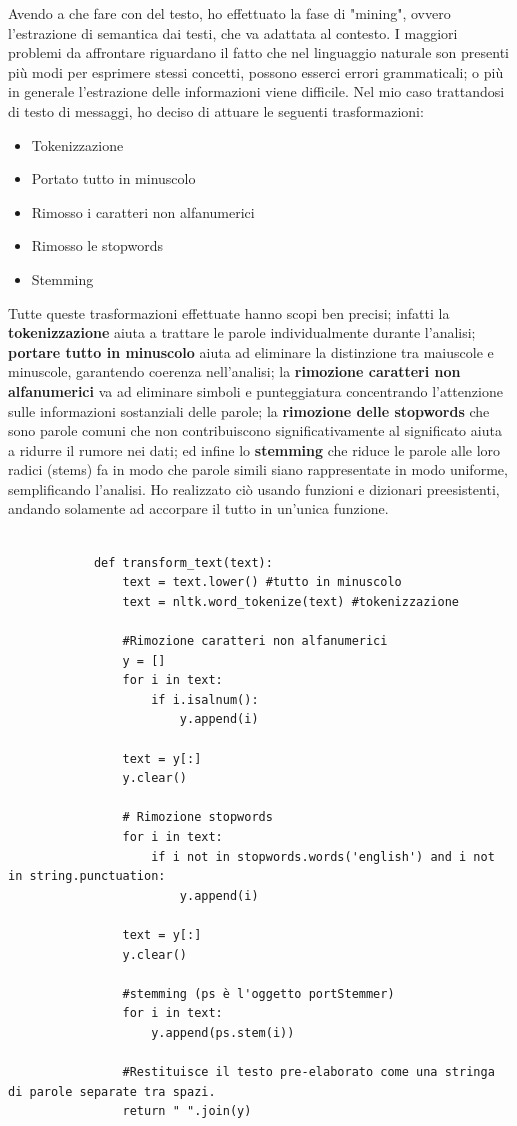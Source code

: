 \documentclass[]{article}
\begin{document}
        Avendo a che fare con del testo, ho effettuato la fase di "mining", ovvero l'estrazione di semantica dai testi, che va adattata al contesto. I maggiori problemi da affrontare riguardano il fatto che nel linguaggio naturale son presenti più modi per esprimere stessi concetti, possono esserci errori grammaticali; o più in generale l'estrazione delle informazioni viene difficile. Nel mio caso trattandosi di testo di messaggi, ho deciso di attuare le seguenti trasformazioni:
        \begin{itemize}
            \item Tokenizzazione
            \item Portato tutto in minuscolo
            \item Rimosso i caratteri non alfanumerici
            \item Rimosso le stopwords
            \item Stemming
        \end{itemize}
        Tutte queste trasformazioni effettuate hanno scopi ben precisi; infatti la \textbf{tokenizzazione} aiuta a trattare le parole individualmente durante l'analisi;
        \textbf{portare tutto in minuscolo} aiuta ad eliminare la distinzione tra maiuscole e minuscole, garantendo coerenza nell'analisi; la \textbf{rimozione caratteri non alfanumerici} va ad eliminare simboli e punteggiatura concentrando l'attenzione sulle informazioni sostanziali delle parole; la \textbf{rimozione delle stopwords} che sono parole comuni che non contribuiscono significativamente al significato aiuta a ridurre il rumore nei dati; ed infine lo \textbf{stemming} che riduce le parole alle loro radici (stems) fa in modo che parole simili siano rappresentate in modo uniforme, semplificando l'analisi.
        Ho realizzato ciò usando funzioni e dizionari preesistenti, andando solamente ad accorpare il tutto in un'unica funzione.
        \newpage
        \begin{verbatim}

            def transform_text(text):
                text = text.lower() #tutto in minuscolo
                text = nltk.word_tokenize(text) #tokenizzazione

                #Rimozione caratteri non alfanumerici
                y = []
                for i in text:
                    if i.isalnum():
                        y.append(i)

                text = y[:]
                y.clear()

                # Rimozione stopwords
                for i in text:
                    if i not in stopwords.words('english') and i not in string.punctuation:
                        y.append(i)

                text = y[:]
                y.clear()

                #stemming (ps è l'oggetto portStemmer)
                for i in text:
                    y.append(ps.stem(i))

                #Restituisce il testo pre-elaborato come una stringa di parole separate tra spazi.
                return " ".join(y)

        \end{verbatim}
\end{document}
